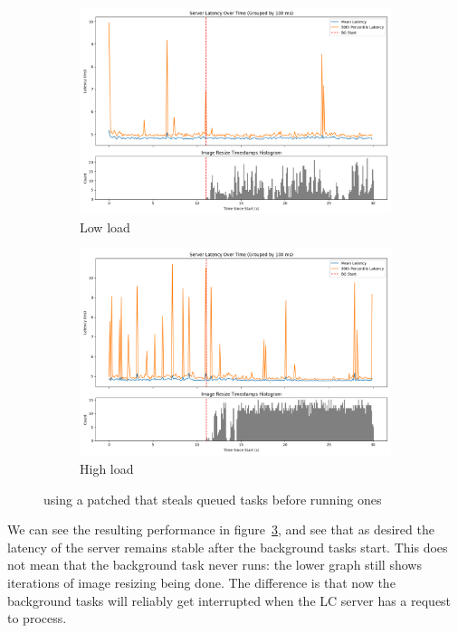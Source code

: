\begin{figure}[t]
    \centering
    \begin{subfigure}[t]{0.48\textwidth}
        \includegraphics[width=\textwidth]{graphs/patched-idle-low-two.png}
        \caption{Low load}\label{fig:patched-idle-low-two}
    \end{subfigure}
    \hspace{\fill}
    \begin{subfigure}[t]{0.48\textwidth}
        \includegraphics[width=\textwidth]{graphs/patched-idle-high-two.png}
        \caption{High load}\label{fig:patched-idle-high-two}
    \end{subfigure}
    \caption{using a patched \schedidle{} that steals queued \schednormal{}
    tasks before running \schedidle{} ones}\label{fig:patched-idle}
\end{figure}

We can see the resulting performance in figure~\ref{fig:patched-idle}, and see
that as desired the latency of the server remains stable after the background
tasks start. This does not mean that the background task never runs: the lower
graph still shows iterations of image resizing being done. The difference is
that now the background tasks will reliably get interrupted when the LC server
has a request to process.

